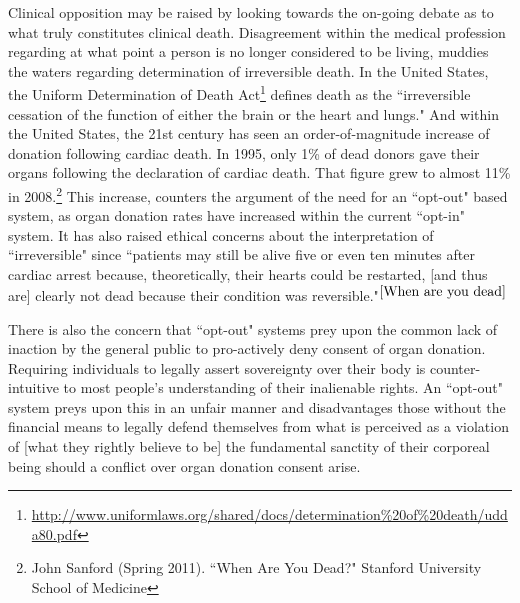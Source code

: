 \documentclass[letterpaper,10pt,twoside]{article}
\begin{document}
Clinical opposition may be raised by looking towards the on-going debate as to what truly constitutes clinical death.  Disagreement within the medical profession regarding at what point a person is no longer considered to be living, muddies the waters regarding determination of irreversible death.  In the United States, the Uniform Determination of Death Act\footnote{\url{http://www.uniformlaws.org/shared/docs/determination\%20of\%20death/udda80.pdf}} defines death as the ``irreversible cessation of the function of either the brain or the heart and lungs."  And within the United States, the 21st century has seen an order-of-magnitude increase of donation following cardiac death.  In 1995, only 1\% of dead donors gave their organs following the declaration of cardiac death.  That figure grew to almost 11\% in 2008.\footnote{\label{When are you dead}John Sanford (Spring 2011). ``When Are You Dead?" Stanford University School of Medicine}  This increase, counters the argument of the need for an ``opt-out" based system, as organ donation rates have increased within the current ``opt-in" system.  It has also raised ethical concerns about the interpretation of ``irreversible" since ``patients may still be alive five or even ten minutes after cardiac arrest because, theoretically, their hearts could be restarted, [and thus are] clearly not dead because their condition was reversible."$^{\ref{When are you dead}}$  

There is also the concern that ``opt-out" systems prey upon the common lack of inaction by the general public to pro-actively deny consent of organ donation.  Requiring individuals to legally assert sovereignty over their body is counter-intuitive to most people's understanding of their inalienable rights.  An ``opt-out" system preys upon this in an unfair manner and disadvantages those without the financial means to legally defend themselves from what is perceived as a violation of [what they rightly believe to be] the fundamental sanctity of their corporeal being should a conflict over organ donation consent arise.
\end{document}
